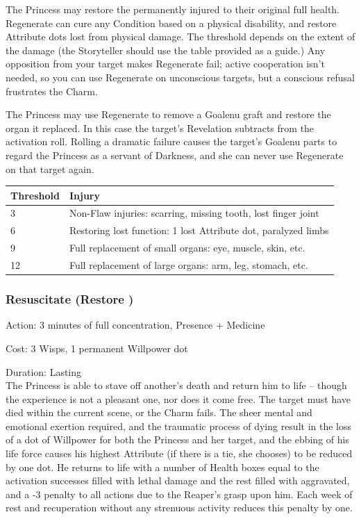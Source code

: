 \noindent The Princess may restore the permanently injured to their original full health. Regenerate can cure any Condition based on a physical disability, and restore Attribute dots lost from physical damage. The threshold depends on the extent of the damage (the Storyteller should use the table provided as a guide.) Any opposition from your target makes Regenerate fail; active cooperation isn't needed, so you can use Regenerate on unconscious targets, but a conscious refusal frustrates the Charm.

The Princess may use Regenerate to remove a Goalenu graft and restore the organ it replaced. In this case the target's Revelation subtracts from the activation roll. Rolling a dramatic failure causes the target's Goalenu parts to regard the Princess as a servant of Darkness, and she can never use Regenerate on that target again.

\begin{table}[H]
    \begin{tabular}{|l|l|}
        \hline
        Threshold & Injury                                                         \\ \hline
        3         & Non-Flaw injuries: scarring, missing tooth, lost finger joint  \\ \hline
        6         & Restoring lost function: 1 lost Attribute dot, paralyzed limbs \\ \hline
        9         & Full replacement of small organs: eye, muscle, skin, etc.      \\ \hline
        12        & Full replacement of large organs: arm, leg, stomach, etc.      \\
        \hline
    \end{tabular}
\end{table}

\subsubsection*{Resuscitate (Restore \textbullet\textbullet\textbullet\textbullet\textbullet)}

\noindent Action: 3 minutes of full concentration, Presence + Medicine

\noindent Cost: 3 Wisps, 1 permanent Willpower dot

\noindent Duration: Lasting \\

\noindent The Princess is able to stave off another's death and return him to life -- though the experience is not a pleasant one, nor does it come free. The target must have died within the current scene, or the Charm fails. The sheer mental and emotional exertion required, and the traumatic process of dying result in the loss of a dot of Willpower for both the Princess and her target, and the ebbing of his life force causes his highest Attribute (if there is a tie, she chooses) to be reduced by one dot. He returns to life with a number of Health boxes equal to the activation successes filled with lethal damage and the rest filled with aggravated, and a -3 penalty to all actions due to the Reaper's grasp upon him. Each week of rest and recuperation without any strenuous activity reduces this penalty by one.

